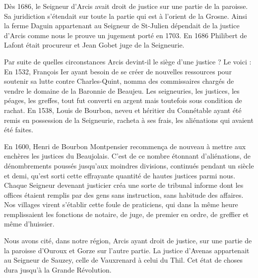 Dès 1686, le Seigneur d'Arcis avait droit de justice sur une partie de la paroisse. Sa juridiction s'étendait sur toute la partie qui est à l'orient de la Grosne. Ainsi la ferme Daguin appartenant au Seigneur de St-Julien dépendait de la justice d'Arcis comme nous le prouve un jugement porté en 1703. En 1686 Philibert de Lafont était procureur et Jean Gobet juge de la Seigneurie.

Par suite de quelles circonstances Arcis devint-il le siège d'une justice ? Le voici : En 1532, François Ier ayant besoin de se créer de nouvelles ressources pour soutenir sa lutte contre Charles-Quint, nomma des commissaires chargés de vendre le domaine de la Baronnie de Beaujeu. Les seigneuries, les justices, les péages, les greffes, tout fut converti en argent mais toutefois sous condition de rachat. En 1538, Louis de Bourbon, neveu et héritier du Connétable ayant été remis en possession de la Seigneurie, racheta à ses frais, les aliénations qui avaient été faites.

En 1600, Henri de Bourbon Montpensier recommença de nouveau à mettre aux enchères les justices du Beaujolais. C'est de ce nombre étonnant d'aliénations, de dénombrements poussés jusqu'aux moindres divisions, continués pendant un siècle et demi, qu'est sorti cette effrayante quantité de hautes justices parmi nous. Chaque Seigneur devenant justicier créa une sorte de tribunal informe dont les offices étaient remplis par des gens sans instruction, sans habitude des affaires. Nos villages virent s'établir cette foule de praticiens, qui dans la même heure remplissaient les fonctions de notaire, de juge, de premier en ordre, de greffier et même d'huissier.

Nous avons cité, dans notre région, Arcis ayant droit de justice, sur une partie de la paroisse d'Ouroux et Gorze sur l'autre partie. La justice d'Avenas appartenait au Seigneur de Sauzey, celle de Vauxrenard à celui du Thil. Cet état de choses dura jusqu'à la Grande Révolution.

